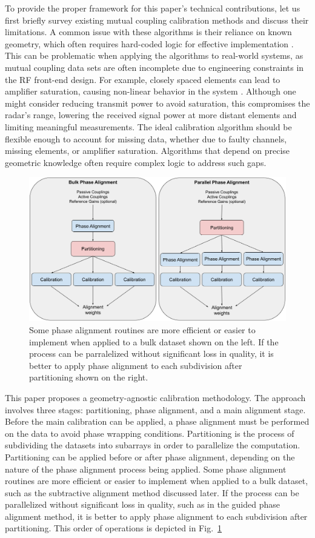 \documentclass[journal]{IEEEtran}
\begin{document}
To provide the proper framework for this paper’s technical contributions, let us first briefly survey existing mutual coupling calibration methods and discuss their limitations.  A common issue with these algorithms is their reliance on known geometry, which often requires hard-coded logic for effective implementation \cite{javier,mitchell,bekers, sasser}. This can be problematic when applying the algorithms to real-world systems, as mutual coupling data sets are often incomplete due to engineering constraints in the RF front-end design. For example, closely spaced elements can lead to amplifier saturation, causing non-linear behavior in the system \cite{MCeffects,zacharydunn,balanisant,bekers,sasser}. Although one might consider reducing transmit power to avoid saturation, this compromises the radar’s range, lowering the received signal power at more distant elements and limiting meaningful measurements. The ideal calibration algorithm should be flexible enough to account for missing data, whether due to faulty channels, missing elements, or amplifier saturation. Algorithms that depend on precise geometric knowledge often require complex logic to address such gaps.

\begin{figure}[hptb]
    \centering
    \includegraphics[width=0.8\linewidth]{orderOfOperations.png}
    \caption{Some phase alignment routines are more efficient or easier to implement when applied to a bulk dataset shown on the left. If the process can be parralelized without significant loss in quality, it is better to apply phase alignment to each subdivision after partitioning shown on the right.}
    \label{fig:orderOfOperations}
\end{figure}

This paper proposes a geometry-agnostic calibration methodology. The approach involves three stages: partitioning, phase alignment, and a main alignment stage. Before the main calibration can be applied, a phase alignment must be performed on the data to avoid phase wrapping conditions. Partitioning is the process of subdividing the datasets into subarrays in order to parallelize the computation. Partitioning can be applied before or after phase alignment, depending on the nature of the phase alignment process being applied. Some phase alignment routines are more efficient or easier to implement when applied to a bulk dataset, such as the subtractive alignment method discussed later. If the process can be parallelized without significant loss in quality, such as in the guided phase alignment method, it is better to apply phase alignment to each subdivision after partitioning. This order of operations is depicted in Fig.~\ref{fig:orderOfOperations}
\end{document}
